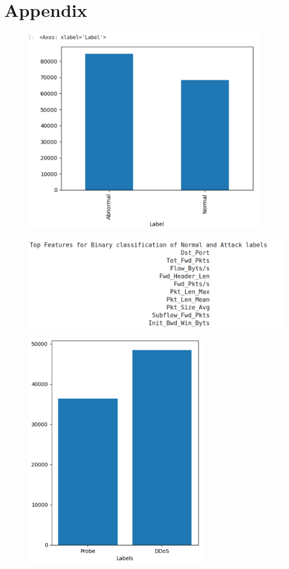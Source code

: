 \chapter*{Appendix}
\begin{figure}[tbh]
	\begin{center}
		\includegraphics[width=4in]{images/binvattlab.png}
	\end{center}
\end{figure}
\begin{figure}[tbh]
	\begin{center}
		\includegraphics[width=6in]{images/top10normatt.png}
	\end{center}
\end{figure}
\begin{figure}[tbh]
	\begin{center}
		\includegraphics[width=3in]{images/attlabels.png}
	\end{center}
\end{figure}
